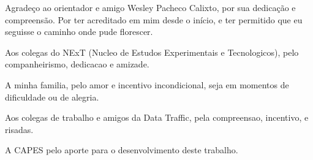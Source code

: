 
\begin{agradecimentos}  %

\hypertarget{estilo:agradecimentos}{} %

Agradeço ao orientador e amigo Wesley Pacheco Calixto, por sua dedicação e compreensão. Por ter acreditado em mim desde o início, e ter permitido que eu seguisse
o caminho onde pude florescer.

Aos colegas do NExT (Nucleo de Estudos Experimentais e Tecnologicos), pelo companheirismo, dedicacao e amizade.

A minha familia, pelo amor e incentivo incondicional, seja em momentos de dificuldade ou de alegria.

Aos colegas de trabalho e amigos da Data Traffic, pela compreensao, incentivo, e risadas.

A CAPES pelo aporte para o desenvolvimento deste trabalho.

\end{agradecimentos}
